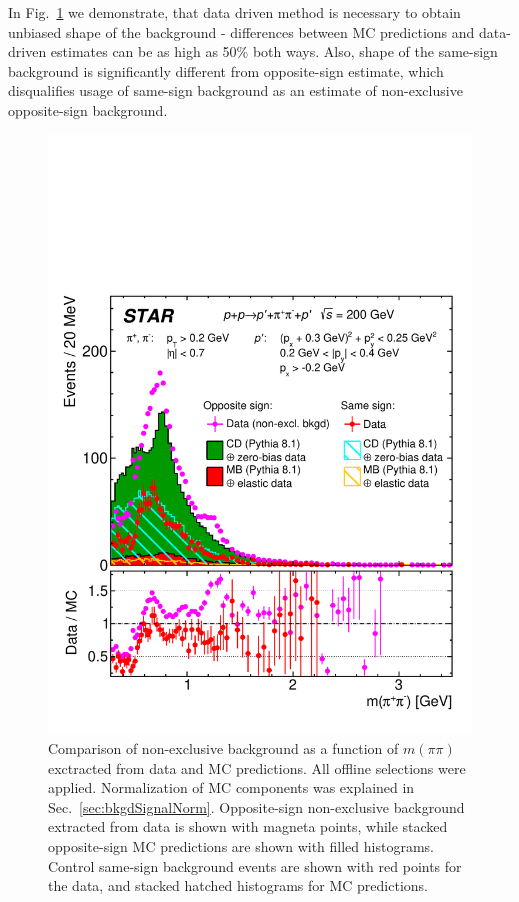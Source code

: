 In Fig.~\ref{fig:Ratio_InvMass} we demonstrate, that data driven method is necessary to obtain unbiased shape of the background - differences between MC predictions and data-driven estimates can be as high as 50\% both ways. Also, shape of the same-sign background is significantly different from opposite-sign estimate, which disqualifies usage of same-sign background as an estimate of non-exclusive opposite-sign background.


\begin{figure}[ht!]
\centering%
\parbox{0.5725\textwidth}{%
  \centering%
  \includegraphics[width=\linewidth]{graphics/backgrounds/dataVsMc/Ratio_InvMass.pdf} 
}%
\quad%
\parbox{0.3725\textwidth}{%
    \caption[Comparison of non-exclusive background as a function of $m(\pi\pi)$ exctracted from data and MC predictions.]{Comparison of non-exclusive background as a function of $m(\pi\pi)$ exctracted from data and MC predictions. All offline selections were applied. Normalization of MC components was explained in Sec.~\ref{sec:bkgdSignalNorm}. Opposite-sign non-exclusive background extracted from data is shown with magneta points, while stacked opposite-sign MC predictions are shown with filled histograms. Control same-sign background events are shown with red points for the data, and stacked hatched histograms for MC predictions.}\label{fig:Ratio_InvMass} %
}
\end{figure}







